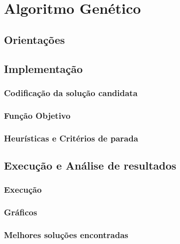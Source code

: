 \section{Algoritmo Genético}

\subsection{Orientações}

\subsection{Implementação}

\subsubsection{Codificação da solução candidata}

\subsubsection{Função Objetivo}

\subsubsection{Heurísticas e Critérios de parada}



\subsection{Execução e Análise de resultados}

\subsubsection{Execução}

\subsubsection{Gráficos}

\subsubsection{Melhores soluções encontradas}
